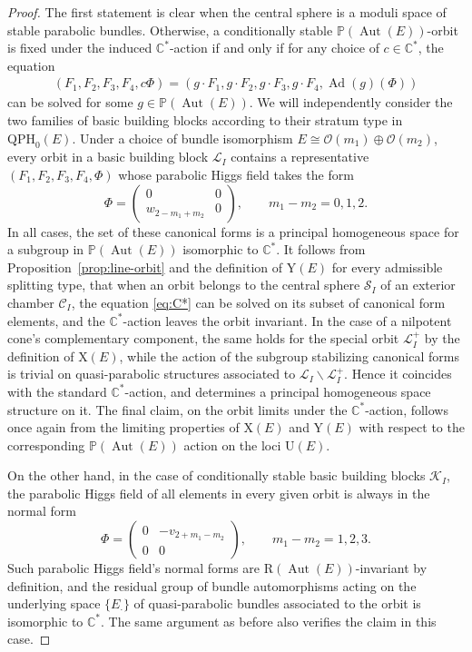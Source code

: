 \documentclass[10pt,a4paper]{amsart}
\newcommand{\field}[1]{\ensuremath{\mathbb{#1}}}
\newcommand{\CC}{\field{C}}
\newcommand{\PP}{\field{P}}
\newcommand{\calO}{\mathcal{O}}
\newcommand{\curly}[1]{\mathscr{#1}}
\newcommand{\cK}{\curly{K}}
\newcommand{\cL}{\curly{L}}
\newcommand{\cS}{\curly{S}}
\newcommand{\qC}{\mathcal{C}}
\newcommand{\qp}{\boldsymbol{\cdot}}
\DeclareMathOperator{\Ad}{Ad}
\DeclareMathOperator{\Aut}{Aut}
\numberwithin{equation}{section}
\begin{document}
\begin{proof}
The first statement is clear when the central sphere is a moduli space of stable parabolic bundles. Otherwise, %
a conditionally stable $\PP(\Aut(E))$-orbit is fixed under the induced $\CC^{*}$-action if and only if for any choice of $c\in \CC^{*}$, the equation
\begin{gather}\label{eq:C*}
(F_{1},F_{2},F_{3},F_{4},c\Phi) = (g\cdot F_{1},g\cdot F_{2},g\cdot F_{3},g\cdot F_{4},\Ad(g)(\Phi))
\end{gather}
can be solved for some $g\in\PP(\Aut(E))$.
We will independently consider the two families of basic building blocks according to their stratum type in $\mathrm{QPH}_{0}(E)$. Under a choice of bundle isomorphism $E\cong \calO(m_{1})\oplus\calO(m_{2})$, every orbit in a basic building block $\cL_{I}$ contains a representative $(F_{1},F_{2},F_{3},F_{4},\Phi)$ whose parabolic Higgs field takes the form
\[
\Phi = \begin{pmatrix}
0 & 0\\
w_{2-m_{1}+m_{2}} & 0
\end{pmatrix}\!,\qquad m_{1}-m_{2} = 0,1,2.
\]
In all cases, the set of these canonical forms is a principal homogeneous space for a subgroup in $\PP(\Aut(E))$ isomorphic to $\CC^{*}$. It follows from Proposition~\ref{prop:line-orbit} and
the definition of $\mathrm{Y}(E)$ for every admissible splitting type, that when an orbit belongs to the central sphere $\cS_{I}$ of an exterior chamber $\qC_{I}$, the equation \eqref{eq:C*} can be solved on its subset of canonical form elements, and the $\CC^{*}$-action leaves the orbit invariant. In the case of a nilpotent cone's complementary component, the same holds for the special orbit $\cL^{+}_{I}$ by the definition of $\mathrm{X}(E)$, while the action of the subgroup stabilizing canonical forms is trivial on quasi-parabolic structures associated to $\cL_{I}\backslash\cL^{+}_{I}$. Hence it coincides with the standard $\CC^{*}$-action, and determines a principal homogeneous space structure on it. The final claim, on the orbit limits under the $\CC^{*}$-action, follows once again from the limiting properties of $\mathrm{X}(E)$ and $\mathrm{Y}(E)$ with respect to the corresponding $\PP(\Aut(E))$ action on the loci $\mathrm{U}(E)$.

On the other hand, in the case of conditionally stable basic building blocks $\cK_{I}$, the parabolic Higgs field of all elements in every given orbit is always in the normal form
\[
\Phi = \begin{pmatrix}
0 & -v_{2+ m_{1} - m_{2}}\\
0 & 0
\end{pmatrix}\!,\qquad m_{1} - m_{2} = 1, 2, 3.
\]
Such parabolic Higgs field's normal forms are $\mathrm{R}(\Aut(E))$-invariant by definition, and the residual group of bundle automorphisms acting on the underlying space $\{E_{\qp}\}$ of quasi-parabolic bundles associated to the orbit is isomorphic to $\CC^{*}$. The same argument as before also verifies the claim in this case.
\end{proof}
\end{document}
